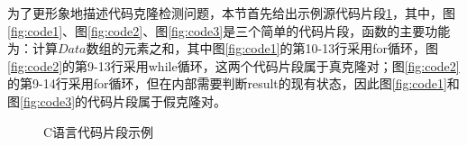 为了更形象地描述代码克隆检测问题，本节首先给出示例源代码片段\ref{fig:code}，其中，图\ref{fig:code1}、图\ref{fig:code2}、图\ref{fig:code3}是三个简单的代码片段，函数的主要功能为：计算$Data$数组的元素之和，其中图\ref{fig:code1}的第10-13行采用for循环，图\ref{fig:code2}的第9-13行采用while循环，这两个代码片段属于真克隆对；图\ref{fig:code2}的第9-14行采用for循环，但在内部需要判断result的现有状态，因此图\ref{fig:code1}和图\ref{fig:code3}的代码片段属于假克隆对。
\begin{figure}[H] 
  \centering  %
  \caption{C语言代码片段示例}    %
  \label{fig:code}    %
\end{figure}
    
